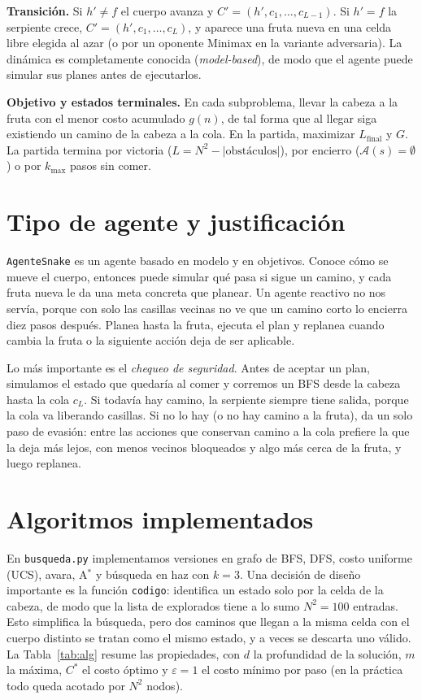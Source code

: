\documentclass[11pt,letterpaper]{article}
\begin{document}
\textbf{Transición.} Si $h'\ne f$ el cuerpo avanza y $C'=(h',c_1,\dots,c_{L-1})$. Si $h'=f$ la serpiente crece, $C'=(h',c_1,\dots,c_L)$, y aparece una fruta nueva en una celda libre elegida al azar (o por un oponente Minimax en la variante adversaria). La dinámica es completamente conocida (\emph{model-based}), de modo que el agente puede simular sus planes antes de ejecutarlos.

\textbf{Objetivo y estados terminales.} En cada subproblema, llevar la cabeza a la fruta con el menor costo acumulado $g(n)$, de tal forma que al llegar siga existiendo un camino de la cabeza a la cola. En la partida, maximizar $L_{\text{final}}$ y $G$. La partida termina por victoria ($L=N^2-|\text{obstáculos}|$), por encierro ($\mathcal{A}(s)=\emptyset$) o por $k_{\max}$ pasos sin comer.

\section{Tipo de agente y justificación}

\texttt{AgenteSnake} es un agente basado en modelo y en objetivos. Conoce cómo se mueve el cuerpo, entonces puede simular qué pasa si sigue un camino, y cada fruta nueva le da una meta concreta que planear. Un agente reactivo no nos servía, porque con solo las casillas vecinas no ve que un camino corto lo encierra diez pasos después. Planea hasta la fruta, ejecuta el plan y replanea cuando cambia la fruta o la siguiente acción deja de ser aplicable.

Lo más importante es el \emph{chequeo de seguridad}. Antes de aceptar un plan, simulamos el estado que quedaría al comer y corremos un BFS desde la cabeza hasta la cola $c_L$. Si todavía hay camino, la serpiente siempre tiene salida, porque la cola va liberando casillas. Si no lo hay (o no hay camino a la fruta), da un solo paso de evasión: entre las acciones que conservan camino a la cola prefiere la que la deja más lejos, con menos vecinos bloqueados y algo más cerca de la fruta, y luego replanea.

\section{Algoritmos implementados}

En \texttt{busqueda.py} implementamos versiones en grafo de BFS, DFS, costo uniforme (UCS), avara, A$^*$ y búsqueda en haz con $k=3$. Una decisión de diseño importante es la función \texttt{codigo}: identifica un estado solo por la celda de la cabeza, de modo que la lista de explorados tiene a lo sumo $N^2=100$ entradas. Esto simplifica la búsqueda, pero dos caminos que llegan a la misma celda con el cuerpo distinto se tratan como el mismo estado, y a veces se descarta uno válido.  La Tabla~\ref{tab:alg} resume las propiedades, con $d$ la profundidad de la solución, $m$ la máxima, $C^*$ el costo óptimo y $\varepsilon=1$ el costo mínimo por paso (en la práctica todo queda acotado por $N^2$ nodos).
\end{document}

